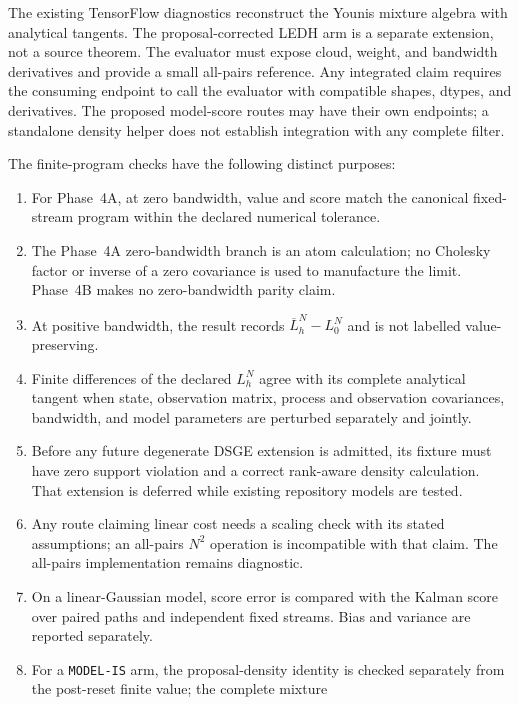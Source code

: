 \documentclass[11pt]{article}
\begin{document}
The existing TensorFlow diagnostics reconstruct the Younis mixture
algebra with analytical tangents.  The proposal-corrected LEDH arm is a
separate extension, not a source theorem.  The evaluator must expose cloud,
weight, and bandwidth derivatives and provide a small all-pairs reference.  Any integrated claim requires the consuming endpoint to call the evaluator
with compatible shapes, dtypes, and derivatives. The proposed model-score
routes may have their own endpoints; a standalone density helper does not
establish integration with any complete filter.

The finite-program checks have the following distinct purposes:
\begin{enumerate}[leftmargin=2em]
  \item For Phase~4A, at zero bandwidth, value and score match the canonical
        fixed-stream program within the declared numerical tolerance.
  \item The Phase~4A zero-bandwidth branch is an atom calculation; no Cholesky
        factor or inverse of a zero covariance is used to manufacture the
        limit.  Phase~4B makes no zero-bandwidth parity claim.
  \item At positive bandwidth, the result records
        $\overline L_h^N-L_0^N$ and is not labelled value-preserving.
  \item Finite differences of the declared $L_h^N$ agree with its complete
        analytical tangent when state, observation matrix, process and
        observation covariances, bandwidth, and model parameters are
        perturbed separately and jointly.
  \item Before any future degenerate DSGE extension is admitted, its fixture
        must have zero support violation and a correct rank-aware density
        calculation.  That extension is deferred while existing repository
        models are tested.
  \item Any route claiming linear cost needs a scaling check with its stated
        assumptions; an all-pairs $N^2$ operation is incompatible with that
        claim.  The all-pairs implementation remains diagnostic.
  \item On a linear-Gaussian model, score error is compared with the Kalman
        score over paired paths and independent fixed streams.  Bias and
        variance are reported separately.
  \item For a \texttt{MODEL-IS} arm, the proposal-density identity is checked
        separately from the post-reset finite value; the complete mixture

\end{enumerate}
\end{document}
